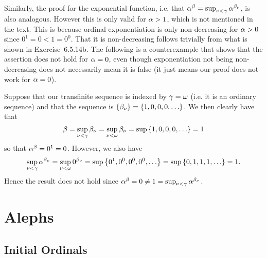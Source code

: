 \begin{questions}
{    Similarly, the proof for the exponential function, i.e. that $\alpha^\beta = \sup_{\nu < \gamma} \alpha^{\beta_\nu}$, is also analogous.
    However this is only valid for $\alpha > 1$, which is not mentioned in the text.
    This is because ordinal exponentiation is only non-decreasing for $\alpha > 0$ since $0^1 = 0 < 1 = 0^0$.
    That it is non-decreasing follows trivially from what is shown in Exercise~6.5.14b.
    The following is a counterexample that shows that the assertion does not hold for $\alpha = 0$, even though exponentiation not being non-decreasing does not necessarily mean it is false (it just means our proof does not work for $\alpha = 0$).

    Suppose that our transfinite sequence is indexed by $\gamma = \omega$ (i.e. it is an ordinary sequence) and that the sequence is $\left\{ \beta_\nu \right\} = \left\{ 1, 0, 0, 0, \ldots \right\}$.
    We then clearly have that
    $$
      \beta = \sup_{\nu < \gamma} \beta_\nu = \sup_{\nu < \omega} \beta_\nu = \sup \left\{ 1, 0, 0, 0, \ldots \right\} = 1
    $$
    so that $\alpha^\beta = 0^1 = 0$.
    However, we also have
    $$
      \sup_{\nu < \gamma} \alpha^{\beta_\nu} = \sup_{\nu < \omega} 0^{\beta_\nu} = \sup\left\{ 0^1, 0^0, 0^0, 0^0, \ldots \right\} = \sup\left\{ 0, 1, 1, 1, \ldots \right\} = 1.
    $$
    Hence the result does not hold since $\alpha^\beta = 0 \neq 1 = \sup_{\nu < \gamma} \alpha^{\beta_\nu}$.
  }

  \section{Alephs}

  \subsection{Initial Ordinals}

\end{questions}
